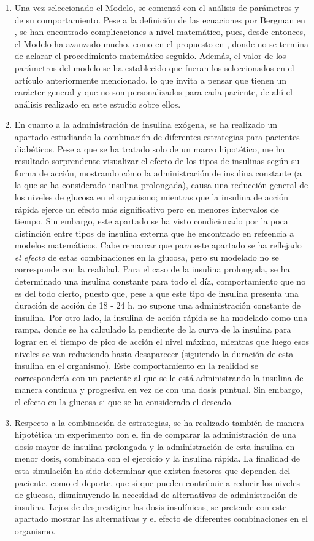 \begin{enumerate}
    \item Una vez seleccionado el Modelo, se comenzó con el análisis de parámetros y de su comportamiento. Pese a la definición de las ecuaciones por Bergman en \cite{bergman1979quantitative}, se han encontrado complicaciones a nivel matemático, pues, desde entonces, el Modelo ha avanzado mucho, como en el propuesto en \cite{fisher1991semiclosed}, donde no se termina de aclarar el procedimiento matemático seguido. Además, el valor de los parámetros del modelo se ha establecido que fueran los seleccionados en el artículo anteriormente mencionado, lo que invita a pensar que tienen un carácter general y que no son personalizados para cada paciente, de ahí el análisis realizado en este estudio sobre ellos.
    \item En cuanto a la administración de insulina exógena, se ha realizado un apartado estudiando la combinación de diferentes estrategias para pacientes diabéticos. Pese a que se ha tratado solo de un marco hipotético, me ha resultado sorprendente visualizar el efecto de los tipos de insulinas según su forma de acción, mostrando cómo la administración de insulina constante (a la que se ha considerado insulina prolongada), causa una reducción general de los niveles de glucosa en el organismo; mientras que la insulina de acción rápida ejerce un efecto más significativo pero en menores intervalos de tiempo. Sin embargo, este apartado se ha visto condicionado por la poca distinción entre tipos de insulina externa que he encontrado en refeencia a modelos matemáticos. Cabe remarcar que para este apartado se ha reflejado \textit{el efecto} de estas combinaciones en la glucosa, pero su modelado no se corresponde con la realidad. Para el caso de la insulina prolongada, se ha determinado una insulina constante para todo el día, comportamiento que no es del todo cierto, puesto que, pese a que este tipo de insulina presenta una duración de acción de 18 - 24 h, no supone una administración constante de insulina. Por otro lado, la insulina de acción rápida se ha modelado como una rampa, donde se ha calculado la pendiente de la curva de la insulina para lograr en el tiempo de pico de acción el nivel máximo, mientras que luego esos niveles se van reduciendo hasta desaparecer (siguiendo la duración de esta insulina en el organismo). Este comportamiento en la realidad se correspondería con un paciente al que se le está administrando la insulina de manera continua y progresiva en vez de con una dosis puntual. Sin embargo, el efecto en la glucosa si que se ha considerado el deseado.
    \item Respecto a la combinación de estrategias, se ha realizado también de manera hipotética un experimento con el fin de comparar la administración de una dosis mayor de insulina prolongada y la administración de esta insulina en menor dosis, combinada con el ejercicio y la insulina rápida. La finalidad de esta simulación ha sido determinar que existen factores que dependen del paciente, como el deporte, que sí que pueden contribuir a reducir los niveles de glucosa, disminuyendo la necesidad de alternativas de administración de insulina. Lejos de desprestigiar las dosis insulínicas, se pretende con este apartado mostrar las alternativas y el efecto de diferentes combinaciones en el organismo.

\end{enumerate}
